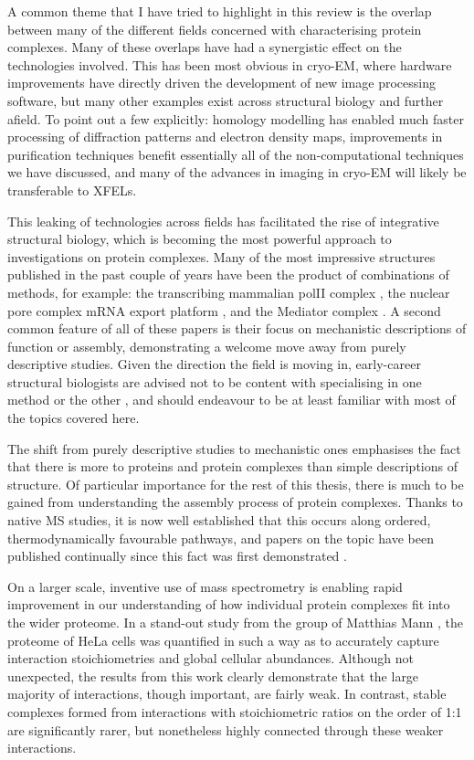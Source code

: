 \documentclass[a4paper,11pt,twoside,openright]{scrbook}
\begin{document}
A common theme that I have tried to highlight in this review is the overlap between many of the different fields concerned with characterising protein complexes. Many of these overlaps have had a synergistic effect on the technologies involved. This has been most obvious in cryo-EM, where hardware improvements have directly driven the development of new image processing software, but many other examples exist across structural biology and further afield. To point out a few explicitly: homology modelling has enabled much faster processing of diffraction patterns and electron density maps, improvements in purification techniques benefit essentially all of the non-computational techniques we have discussed, and many of the advances in imaging in cryo-EM will likely be transferable to XFELs.

This leaking of technologies across fields has facilitated the rise of integrative structural biology, which is becoming the most powerful approach to investigations on protein complexes. Many of the most impressive structures published in the past couple of years have been the product of combinations of methods, for example: the transcribing mammalian polII complex \cite{Bernecky2016}, the nuclear pore complex mRNA export platform \cite{Fernandez-Martinez2016}, and the Mediator complex \cite{Tsai2017}. A second common feature of all of these papers is their focus on mechanistic descriptions of function or assembly, demonstrating a welcome move away from purely descriptive studies. Given the direction the field is moving in, early-career structural biologists are advised not to be content with specialising in one method or the other \cite{Shi2014,Cassiday2014}, and should endeavour to be at least familiar with most of the topics covered here.

The shift from purely descriptive studies to mechanistic ones emphasises the fact that there is more to proteins and protein complexes than simple descriptions of structure. Of particular importance for the rest of this thesis, there is much to be gained from understanding the assembly process of protein complexes. Thanks to native MS studies, it is now well established that this occurs along ordered, thermodynamically favourable pathways, and papers on the topic have been published continually since this fact was first demonstrated \cite{Levy2008,Marsh2013,Appolaire2014,Macek2017,Mallik2017}.

On a larger scale, inventive use of mass spectrometry is enabling rapid improvement in our understanding of how individual protein complexes fit into the wider proteome. In a stand-out study from the group of Matthias Mann \cite{Hein2015}, the proteome of HeLa cells was quantified in such a way as to accurately capture interaction stoichiometries and global cellular abundances. Although not unexpected, the results from this work clearly demonstrate that the large majority of interactions, though important, are fairly weak. In contrast, stable complexes formed from interactions with stoichiometric ratios on the order of 1:1 are significantly rarer, but nonetheless highly connected through these weaker interactions.
\end{document}
